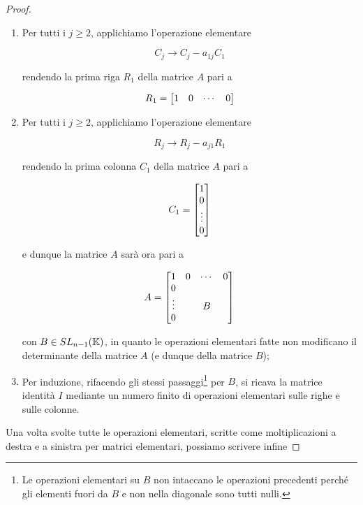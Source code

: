 \begin{proof}
\begin{enumerate}
		\item Per tutti i $ j \geqslant 2 $, applichiamo l'operazione elementare
		
		\begin{equation}
			C_{j} \to C_{j} - a_{1j} C_{1}
		\end{equation}
	
		rendendo la prima riga $ R_{1} $ della matrice $ A $ pari a 
		
		\begin{equation}
			R_{1} = \bmqty{ 1 & 0 & \cdots & 0 }
		\end{equation}
		
		\item Per tutti i $ j \geqslant 2 $, applichiamo l'operazione elementare
		
		\begin{equation}
			R_{j} \to R_{j} - a_{j1} R_{1}
		\end{equation}
		
		rendendo la prima colonna $ C_{1} $ della matrice $ A $ pari a 
		
		\begin{equation}
			C_{1} = \bmqty{ 1 \\ 0 \\ \vdots \\ 0 }
		\end{equation}
	
		e dunque la matrice $ A $ sarà ora pari a
		
		\begin{equation}
			A = %
			\bmqty{ %
					1 & 0 & \cdots & 0 \\ %
					0 & & & \\ %
					\vdots & & B &\\ %
					0 & & & %
					}
		\end{equation}
	
		con $ B \in SL_{n-1}(\mathbb{K}) $, in quanto le operazioni elementari fatte non modificano il determinante della matrice $ A $ (e dunque della matrice $ B $);
		
		\item Per induzione, rifacendo gli stessi passaggi\footnote{%
			Le operazioni elementari su $ B $ non intaccano le operazioni precedenti perché gli elementi fuori da $ B $ e non nella diagonale sono tutti nulli.%
		} per $ B $, si ricava la matrice identità $ I $ mediante un numero finito di operazioni elementari sulle righe e sulle colonne.
	\end{enumerate}

	Una volta svolte tutte le operazioni elementari, scritte come moltiplicazioni a destra e a sinistra per matrici elementari, possiamo scrivere infine
	

\end{proof}

